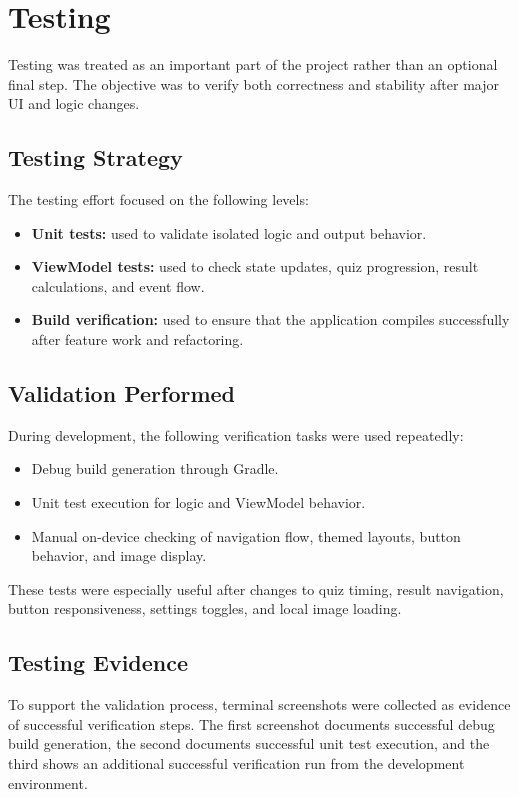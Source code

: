 \documentclass[12pt,a4paper]{article}
\begin{document}
\section{Testing}
Testing was treated as an important part of the project rather than an optional final step. The objective was to verify both correctness and stability after major UI and logic changes.

\subsection{Testing Strategy}
The testing effort focused on the following levels:
\begin{itemize}[leftmargin=1.5em]
    \item \textbf{Unit tests:} used to validate isolated logic and output behavior.
    \item \textbf{ViewModel tests:} used to check state updates, quiz progression, result calculations, and event flow.
    \item \textbf{Build verification:} used to ensure that the application compiles successfully after feature work and refactoring.
\end{itemize}

\subsection{Validation Performed}
During development, the following verification tasks were used repeatedly:
\begin{itemize}[leftmargin=1.5em]
    \item Debug build generation through Gradle.
    \item Unit test execution for logic and ViewModel behavior.
    \item Manual on-device checking of navigation flow, themed layouts, button behavior, and image display.
\end{itemize}

These tests were especially useful after changes to quiz timing, result navigation, button responsiveness, settings toggles, and local image loading.

\subsection{Testing Evidence}
To support the validation process, terminal screenshots were collected as evidence of successful verification steps. The first screenshot documents successful debug build generation, the second documents successful unit test execution, and the third shows an additional successful verification run from the development environment.
\end{document}
